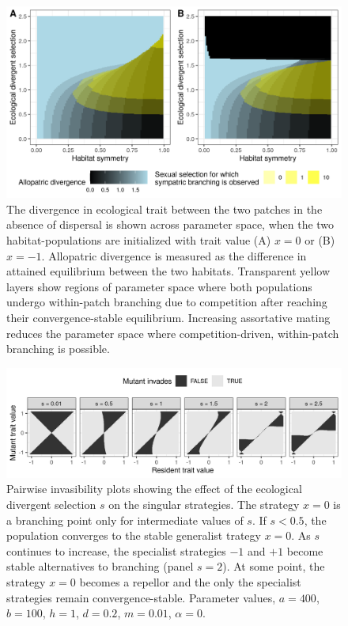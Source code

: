 \begin{figure}
    \centering
    \includegraphics[width=\textwidth]{figures/divergence_across_patches}
    \caption{The divergence in ecological trait between the two patches in the absence of dispersal is shown across parameter space, when the two habitat-populations are initialized with trait value (A) $x = 0$ or (B) $x = -1$. Allopatric divergence is measured as the difference in attained equilibrium between the two habitats. Transparent yellow layers show regions of parameter space where both populations undergo within-patch branching due to competition after reaching their convergence-stable equilibrium. Increasing assortative mating reduces the parameter space where competition-driven, within-patch branching is possible.}
    \label{fig:map_divergence}
\end{figure}

\begin{figure}
    \centering
    \includegraphics[width=\textwidth]{figures/pairwise_invasibility_plots_test_s}
    \caption{Pairwise invasibility plots showing the effect of the ecological divergent selection $s$ on the singular strategies. The strategy $x = 0$ is a branching point only for intermediate values of $s$. If $s < 0.5$, the population converges to the stable generalist trategy $x = 0$. As $s$ continues to increase, the specialist strategies $-1$ and $+1$ become stable alternatives to branching (panel $s = 2$). At some point, the strategy $x = 0$ becomes a repellor and the only the specialist strategies remain convergence-stable. Parameter values, $a = 400$, $b = 100$, $h = 1$, $d = 0.2$, $m = 0.01$, $\alpha = 0$.}
    \label{fig:pairwise_invasibility_s}
\end{figure}

